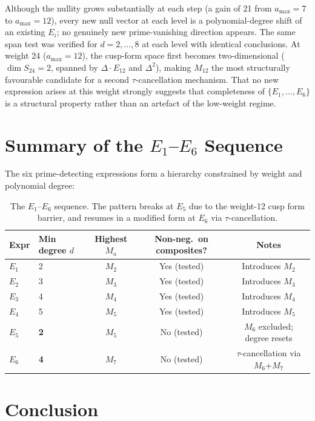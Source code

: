 \documentclass[11pt]{article}
\begin{document}
Although the nullity grows substantially at each step (a gain of 21 from $a_{\max}=7$
to $a_{\max}=12$), every new null vector at each level is a polynomial-degree shift of
an existing $E_i$; no genuinely new prime-vanishing direction appears.
The same span test was verified for $d=2,\ldots,8$ at each level with identical conclusions.
At weight 24 ($a_{\max}=12$), the cusp-form space first becomes two-dimensional
($\dim S_{24}=2$, spanned by $\Delta\cdot E_{12}$ and $\Delta^2$), making $M_{12}$ the
most structurally favourable candidate for a second $\tau$-cancellation mechanism.
That no new expression arises at this weight strongly suggests that completeness of
$\{E_1,\dots,E_6\}$ is a structural property rather than an artefact of the low-weight
regime.

\section{Summary of the $E_1$--$E_6$ Sequence}
\label{sec:summary}

The six prime-detecting expressions form a hierarchy constrained by weight and polynomial
degree:

\begin{table}[htbp]
\centering
\caption{The $E_1$--$E_6$ sequence. The pattern breaks at $E_5$ due to the weight-12
cusp form barrier, and resumes in a modified form at $E_6$ via $\tau$-cancellation.}
\begin{tabular}{@{}llccc@{}}
\toprule
Expr & Min degree $d$ & Highest $M_a$ & Non-neg.\ on composites? & Notes \\
\midrule
$E_1$ & 2 & $M_2$ & Yes (tested) & Introduces $M_2$ \\
$E_2$ & 3 & $M_3$ & Yes (tested) & Introduces $M_3$ \\
$E_3$ & 4 & $M_4$ & Yes (tested) & Introduces $M_4$ \\
$E_4$ & 5 & $M_5$ & Yes (tested) & Introduces $M_5$ \\
$E_5$ & \textbf{2} & $M_5$ & No (tested)  & $M_6$ excluded; degree resets \\
$E_6$ & \textbf{4} & $M_7$ & No (tested)  & $\tau$-cancellation via $M_6$+$M_7$ \\
\bottomrule
\end{tabular}
\end{table}

\section{Conclusion}
\label{sec:conclusion}
\end{document}
